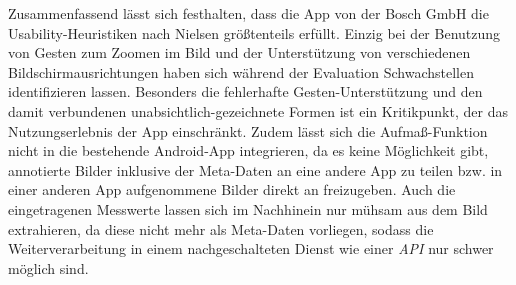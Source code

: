 Zusammenfassend lässt sich festhalten, dass die App \mm{} von der Bosch GmbH die Usability-Heuristiken nach Nielsen größtenteils erfüllt.
Einzig bei der Benutzung von Gesten zum Zoomen im Bild und der Unterstützung von verschiedenen Bildschirmausrichtungen haben sich während der Evaluation Schwachstellen identifizieren lassen.
Besonders die fehlerhafte Gesten-Unterstützung und den damit verbundenen unabsichtlich-gezeichnete Formen ist ein Kritikpunkt, der das Nutzungserlebnis der App einschränkt.
Zudem lässt sich die Aufmaß-Funktion nicht in die bestehende Android-App integrieren, da es keine Möglichkeit gibt, annotierte Bilder inklusive der Meta-Daten an eine andere App zu teilen bzw. in einer anderen App aufgenommene Bilder direkt an \mm{} freizugeben.
Auch die eingetragenen Messwerte lassen sich im Nachhinein nur mühsam aus dem Bild extrahieren, da diese nicht mehr als Meta-Daten vorliegen, sodass die Weiterverarbeitung in einem nachgeschalteten Dienst wie einer \emph{API} nur schwer möglich sind.

